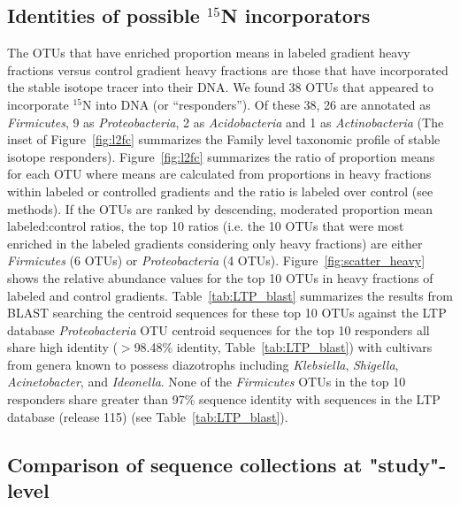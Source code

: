 \subsection{Identities of possible $^{15}$N incorporators} The OTUs that have
enriched proportion means in labeled gradient heavy fractions versus control
gradient heavy fractions are those that have incorporated the stable isotope
tracer into their DNA. We found 38 OTUs that appeared to incorporate $^{15}$N
into DNA (or ``responders''). Of these 38, 26 are annotated as
\textit{Firmicutes}, 9 as \textit{Proteobacteria}, 2 as
\textit{Acidobacteria} and 1 as \textit{Actinobacteria} (The inset of
Figure~\ref{fig:l2fc} summarizes the Family level taxonomic profile of stable
isotope responders).  Figure~\ref{fig:l2fc} summarizes the ratio of
proportion means for each OTU where means are calculated from proportions in
heavy fractions within labeled or controlled gradients and the ratio is
labeled over control (see methods). If the OTUs are ranked by descending,
moderated proportion mean labeled:control ratios, the top 10 ratios (i.e. the
10 OTUs that were most enriched in the labeled gradients considering only
heavy fractions) are either \textit{Firmicutes} (6 OTUs) or
\textit{Proteobacteria} (4 OTUs).  Figure~\ref{fig:scatter_heavy} shows the
relative abundance values for the top 10 OTUs in heavy fractions of labeled
and control gradients.  Table~\ref{tab:LTP_blast} summarizes the results from
BLAST searching the centroid sequences for these top 10 OTUs against the LTP
database \textit{Proteobacteria} OTU centroid sequences for the top 10
responders all share high identity ($>$98.48\% identity,
Table~\ref{tab:LTP_blast}) with cultivars from genera known to possess
diazotrophs including \textit{Klebsiella}, \textit{Shigella},
\textit{Acinetobacter}, and \textit{Ideonella}. None of the
\textit{Firmicutes} OTUs in the top 10 responders share greater than 97\%
sequence identity with sequences in the LTP database (release 115) (see
Table~\ref{tab:LTP_blast}).

\subsection{Comparison of sequence collections at "study"-level}
